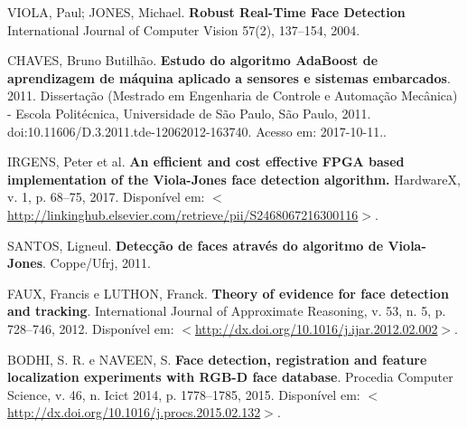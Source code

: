 \documentclass[12pt,a4paper]{article}
\begin{document}
\noindent VIOLA, Paul; JONES, Michael. \textbf{Robust Real-Time Face
Detection}  International Journal of Computer Vision
57(2), 137–154, 2004.\\\vspace{0.2cm}


\noindent CHAVES, Bruno Butilhão. \textbf{Estudo do algoritmo AdaBoost de aprendizagem de máquina aplicado a sensores e sistemas embarcados}. 2011. Dissertação (Mestrado em Engenharia de Controle e Automação Mecânica) - Escola Politécnica, Universidade de São Paulo, São Paulo, 2011. doi:10.11606/D.3.2011.tde-12062012-163740. Acesso em: 2017-10-11..\\\vspace{0.2cm}


\noindent IRGENS, Peter et al. \textbf{An efficient and cost effective FPGA based implementation of the Viola-Jones face detection algorithm.} HardwareX, v. 1, p. 68–75, 2017. Disponível em: $<$\url{http://linkinghub.elsevier.com/retrieve/pii/S2468067216300116}$>$.\\\vspace{0.2cm}

\noindent SANTOS, Ligneul. \textbf{Detecção de faces através do algoritmo de Viola-Jones}. Coppe/Ufrj, 2011.\\\vspace{0.2cm}

\noindent FAUX, Francis e LUTHON, Franck. \textbf{Theory of evidence for face detection and tracking}. International Journal of Approximate Reasoning, v. 53, n. 5, p. 728–746, 2012. Disponível em: $<$\url{http://dx.doi.org/10.1016/j.ijar.2012.02.002}$>$.\\\vspace{0.2cm}

\noindent BODHI, S. R. e NAVEEN, S. \textbf{Face detection, registration and feature localization experiments with RGB-D face database}. Procedia Computer Science, v. 46, n. Icict 2014, p. 1778–1785, 2015. Disponível em: $<$\url{http://dx.doi.org/10.1016/j.procs.2015.02.132}$>$.
\end{document}
